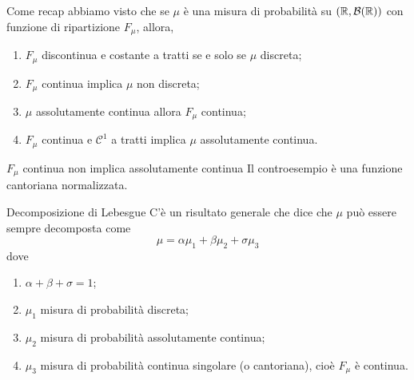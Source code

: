 \documentclass[a4paper]{article}
\begin{document}
Come recap abbiamo visto che se \(\mu\) è una misura di probabilità
su \((\mathbb{R}, \mathcal B(\mathbb{R}))\) con funzione di ripartizione \(F_\mu\), allora,
\begin{enumerate}
    \item \(F_\mu\) discontinua e costante a tratti se e solo se \(\mu\) discreta;
    \item \(F_\mu\) continua implica \(\mu\) non discreta;
    \item \(\mu\) assolutamente continua allora \(F_\mu\) continua;
    \item \(F_\mu\) continua e \(\mathcal C^1\) a tratti implica \(\mu\) assolutamente continua.
\end{enumerate}

\begin{snippetexample}{\(F_\mu\) continua non implica assolutamente continua}
    Il controesempio è una funzione cantoriana normalizzata.
\end{snippetexample}

\begin{snippettheorem}{Decomposizione di Lebesgue}
    C'è un risultato generale che dice che \(\mu\)
    può essere sempre decomposta
    come \[
        \mu = \alpha \mu_1 + \beta \mu_2 + \sigma \mu_3
    \]
    dove
    \begin{enumerate}
        \item \(\alpha + \beta + \sigma = 1\);
        \item \(\mu_1\) misura di probabilità discreta;
        \item \(\mu_2\) misura di probabilità assolutamente continua;
        \item \(\mu_3\) misura di probabilità continua singolare (o cantoriana),
            cioè \(F_\mu\) è continua.
    \end{enumerate}
\end{snippettheorem}
\end{document}
